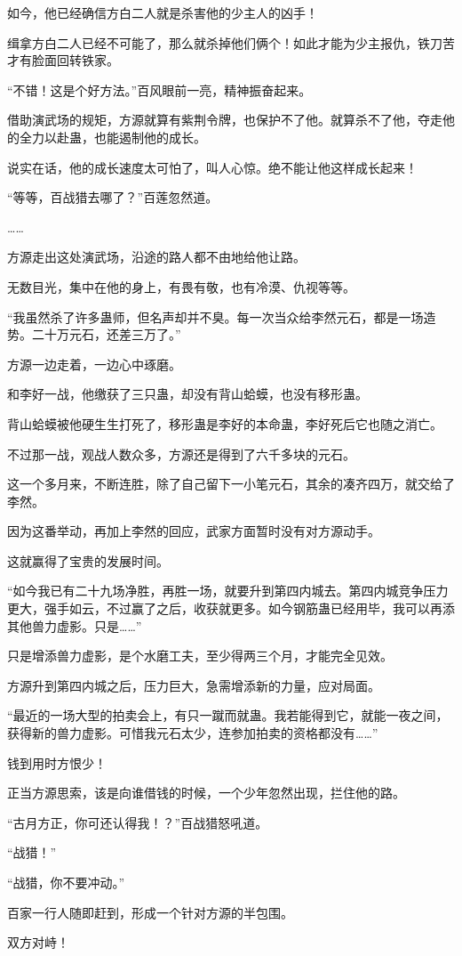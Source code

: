 \begin{this_body}
如今，他已经确信方白二人就是杀害他的少主人的凶手！

缉拿方白二人已经不可能了，那么就杀掉他们俩个！如此才能为少主报仇，铁刀苦才有脸面回转铁家。

“不错！这是个好方法。”百风眼前一亮，精神振奋起来。

借助演武场的规矩，方源就算有紫荆令牌，也保护不了他。就算杀不了他，夺走他的全力以赴蛊，也能遏制他的成长。

说实在话，他的成长速度太可怕了，叫人心惊。绝不能让他这样成长起来！

“等等，百战猎去哪了？”百莲忽然道。

……

方源走出这处演武场，沿途的路人都不由地给他让路。

无数目光，集中在他的身上，有畏有敬，也有冷漠、仇视等等。

“我虽然杀了许多蛊师，但名声却并不臭。每一次当众给李然元石，都是一场造势。二十万元石，还差三万了。”

方源一边走着，一边心中琢磨。

和李好一战，他缴获了三只蛊，却没有背山蛤蟆，也没有移形蛊。

背山蛤蟆被他硬生生打死了，移形蛊是李好的本命蛊，李好死后它也随之消亡。

不过那一战，观战人数众多，方源还是得到了六千多块的元石。

这一个多月来，不断连胜，除了自己留下一小笔元石，其余的凑齐四万，就交给了李然。

因为这番举动，再加上李然的回应，武家方面暂时没有对方源动手。

这就赢得了宝贵的发展时间。

“如今我已有二十九场净胜，再胜一场，就要升到第四内城去。第四内城竞争压力更大，强手如云，不过赢了之后，收获就更多。如今钢筋蛊已经用毕，我可以再添其他兽力虚影。只是……”

只是增添兽力虚影，是个水磨工夫，至少得两三个月，才能完全见效。

方源升到第四内城之后，压力巨大，急需增添新的力量，应对局面。

“最近的一场大型的拍卖会上，有只一蹴而就蛊。我若能得到它，就能一夜之间，获得新的兽力虚影。可惜我元石太少，连参加拍卖的资格都没有……”

钱到用时方恨少！

正当方源思索，该是向谁借钱的时候，一个少年忽然出现，拦住他的路。

“古月方正，你可还认得我！？”百战猎怒吼道。

“战猎！”

“战猎，你不要冲动。”

百家一行人随即赶到，形成一个针对方源的半包围。

双方对峙！

\end{this_body}

